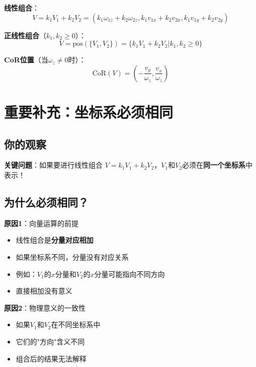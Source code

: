 \documentclass[12pt,a4paper]{article}
\begin{document}
\textbf{线性组合}：
\begin{equation}
V = k_1 V_1 + k_2 V_2 = (k_1 \omega_{1z} + k_2 \omega_{2z}, k_1 v_{1x} + k_2 v_{2x}, k_1 v_{1y} + k_2 v_{2y})
\end{equation}

\textbf{正线性组合}（$k_1, k_2 \geq 0$）：
\begin{equation}
V = \text{pos}(\{V_1, V_2\}) = \{k_1 V_1 + k_2 V_2 | k_1, k_2 \geq 0\}
\end{equation}

\textbf{CoR位置}（当$\omega_z \neq 0$时）：
\begin{equation}
\text{CoR}(V) = \left(-\frac{v_y}{\omega_z}, \frac{v_x}{\omega_z}\right)
\end{equation}

\section{重要补充：坐标系必须相同}

\subsection{你的观察}

\textbf{关键问题}：如果要进行线性组合 $V = k_1 V_1 + k_2 V_2$，$V_1$和$V_2$必须在\textbf{同一个坐标系}中表示！

\subsection{为什么必须相同？}

\textbf{原因1}：向量运算的前提

\begin{itemize}
\item 线性组合是\textbf{分量对应相加}
\item 如果坐标系不同，分量没有对应关系
\item 例如：$V_1$的$x$分量和$V_2$的$x$分量可能指向不同方向
\item 直接相加没有意义
\end{itemize}

\textbf{原因2}：物理意义的一致性

\begin{itemize}
\item 如果$V_1$和$V_2$在不同坐标系中
\item 它们的"方向"含义不同
\item 组合后的结果无法解释
\end{itemize}
\end{document}
